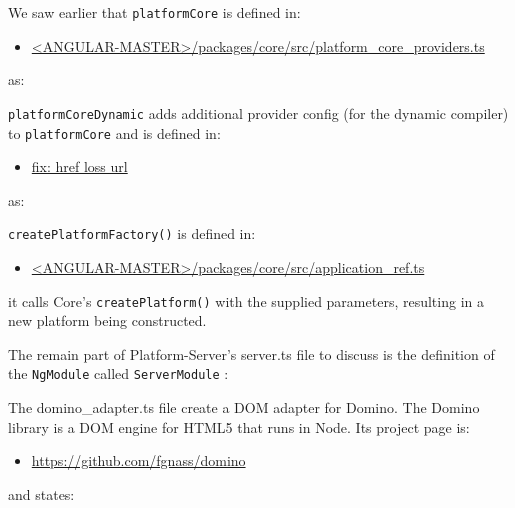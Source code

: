 

We saw earlier that
\texttt{platformCore}
is defined in:

\begin{itemize}
  \item \href{https://github.com/angular/angular/blob/master/packages/core/src/platform_core_providers.ts}
        {<ANGULAR-MASTER>/packages/core/src/platform\_core\_providers.ts}
\end{itemize}

as:



\texttt{platformCoreDynamic}
adds additional provider config (for the dynamic compiler) to
\texttt{platformCore}
and is defined in:

\begin{itemize}
  \item \href{fix: href loss url}
        {fix: href loss url}
\end{itemize}

as:



\texttt{createPlatformFactory()}
is defined in:

\begin{itemize}
  \item \href{https://github.com/angular/angular/blob/master/packages/core/src/application_ref.ts}
        {<ANGULAR-MASTER>/packages/core/src/application\_ref.ts}
\end{itemize}

it calls Core’s
\texttt{createPlatform()}
with the supplied parameters, resulting in a new
platform being constructed.

The remain part of Platform-Server’s server.ts file to discuss is the definition of the
\texttt{NgModule}
called
\texttt{ServerModule}
:



The domino\_adapter.ts file create a DOM adapter for Domino. The Domino library is a
DOM engine for HTML5 that runs in Node. Its project page is:

\begin{itemize}
  \item \url{https://github.com/fgnass/domino}
\end{itemize}

and states:

